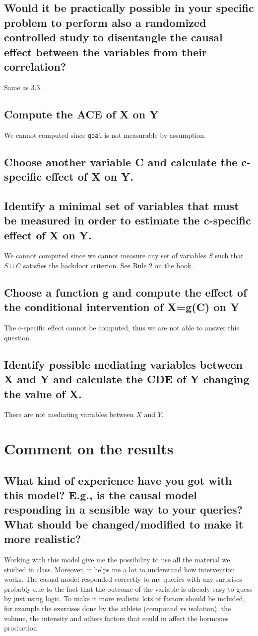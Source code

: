 \documentclass[11pt]{article}
\begin{document}
\subsection{Would it be practically possible in your specific problem to perform also a randomized controlled study to disentangle the causal effect between the variables from their correlation?}
Same as 3.3.
\subsection{Compute the ACE of X on Y}
We cannot computed since \texttt{goal} is not measurable by assumption.
\subsection{Choose another variable C and calculate the c-specific effect of X on Y.}
\subsection{Identify a minimal set of variables that must be measured in order to estimate the c-specific effect of X on Y.}
We cannot computed since we cannot measure any set of variables $S$ such that $S \cup C$ satisfies the backdoor criterion. See Rule 2 on the book.

\subsection{Choose a function g and compute the effect of the conditional intervention of X=g(C) on Y}
The c-specific effect cannot be computed, thus we are not able to answer this question.

\subsection{Identify possible mediating variables between X and Y and calculate the CDE of Y changing the value of X.}
There are not mediating variables between $X$ and $Y$. 

\section{Comment on the results}
\subsection{What kind of experience have you got with this model? E.g., is the causal model responding in a sensible way to your queries? What should be changed/modified to make it more realistic?
}
Working with this model give me the possibility to use all the material we studied in class. Moreover, it helps me a lot to understand how intervention works. The casual model responded correctly to my queries with any surprises probably due to the fact that the outcome of the variable is already easy to guess by just using logic. To make it more realistic lots of factors should be included, for example the exercises done by the athlete (compound vs isolation), the volume, the intensity and others factors that could in affect the hormones production.
\end{document}
